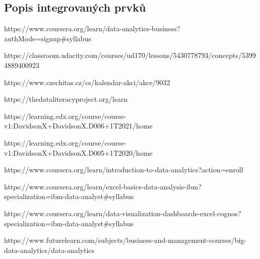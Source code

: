 \hypertarget{popis-integrovanuxfdch-prvkux16f}{%
\subsection{Popis integrovaných prvků}\label{popis-integrovanuxfdch-prvkux16f}}

https://www.coursera.org/learn/data-analytics-business?authMode=signup\#syllabus

https://classroom.udacity.com/courses/ud170/lessons/5430778793/concepts/53994889400923

https://www.czechitas.cz/cs/kalendar-akci/akce/9032

https://thedataliteracyproject.org/learn

https://learning.edx.org/course/course-v1:DavidsonX+DavidsonX.D006+1T2021/home

https://learning.edx.org/course/course-v1:DavidsonX+DavidsonX.D005+1T2020/home

https://www.coursera.org/learn/introduction-to-data-analytics?action=enroll

https://www.coursera.org/learn/excel-basics-data-analysis-ibm?specialization=ibm-data-analyst\#syllabus

https://www.coursera.org/learn/data-visualization-dashboards-excel-cognos?specialization=ibm-data-analyst\#syllabus

https://www.futurelearn.com/subjects/business-and-management-courses/big-data-analytics/data-analytics
